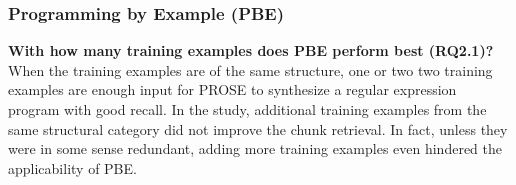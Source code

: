 \begin{table}[tbp]
\caption{Recommendations for each of the investigated chunk retrieval
techniques.}
\label{tab:single-technique-recommendations}

\end{table}

\subsubsection{Programming by Example (PBE)}

\noindent
\textbf{With how many training examples does PBE perform best (RQ2.1)?}
When the training examples are of the same structure, one or two
two training examples are enough input for PROSE to synthesize a regular
expression program with good recall.
In the study, additional training
examples from the same structural category
did not improve the chunk retrieval.
In fact, unless they
were in some sense redundant, adding more training examples even
hindered the applicability of PBE.

